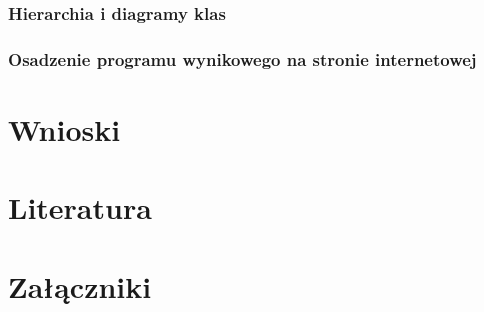 \documentclass{article} %
\begin{document}
        \subsubsection{Hierarchia i diagramy klas}
        \subsubsection{Osadzenie programu wynikowego na stronie internetowej}



\section{Wnioski}


\newpage
\section{Literatura}

\newpage
\section{Załączniki}
\end{document}
